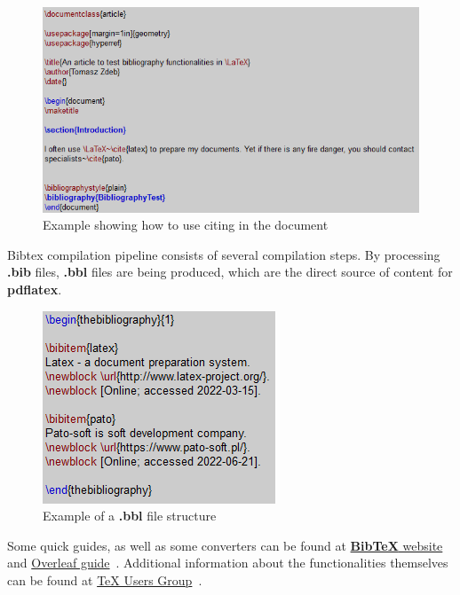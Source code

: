 \begin{figure}[H]
\centering
\includegraphics[scale=0.9]{content/LaTeX/figures/biblio_latex.png}
\caption{Example showing how to use citing in the document}
\label{fig:biblio_usage}
\end{figure}

Bibtex compilation pipeline consists of several compilation steps. By processing \textbf{.bib} files, \textbf{.bbl} files are being produced, which are the direct source of content for \textbf{pdflatex}.

\begin{figure}[H]
\centering
\includegraphics[scale=0.9]{content/LaTeX/figures/biblio_bbl.png}
\caption{Example of a \textbf{.bbl} file structure}
\label{fig:biblio_bbl_example}
\end{figure}

Some quick guides, as well as some converters can be found at \href{https://www.bibtex.com/g/bibtex-format/}{\textbf{BibTeX} website}~\cite{bibtex_format} and \href{https://www.overleaf.com/learn/latex/Bibliography_management_with_bibtex}{Overleaf guide}~\cite{bibliography_management}. Additional information about the functionalities themselves can be found at \href{https://tug.org/bibtex/}{TeX Users Group}~\cite{tex_user_group_bibtex}.\\

